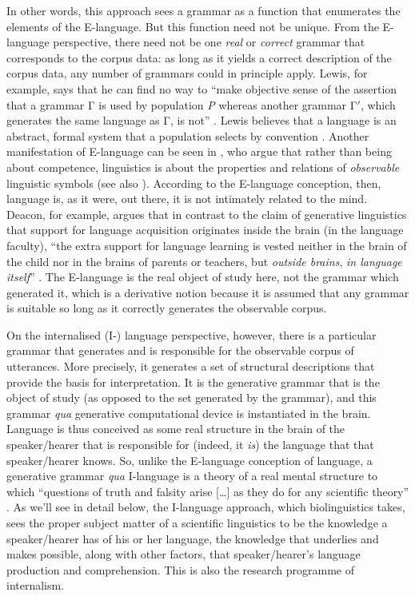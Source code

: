 In other words, this approach sees a grammar as a function that enumerates the elements of the E-language. But this function need not be unique. From the E-language perspective, there need not be one \textit{real} or \textit{correct} grammar that corresponds to the corpus data: as long as it yields a correct description of the corpus data, any number of grammars could in principle apply. Lewis, for example, says that he can find no way to “make objective sense of the assertion that a grammar Γ is used by population \textit{P} whereas another grammar Γ$'$, which generates the same language as Γ, is not” \citep[20]{Lewis1975}. Lewis believes that a language is an abstract, formal system that a population selects by convention \citep{Lewis1969}. Another manifestation of E-language can be seen in \citet{DevittSterelny1989}, who argue that rather than being about competence, linguistics is about the properties and relations of \textit{observable} linguistic symbols (see also \citealt{Devitt2006}). According to the E-language conception, then, language is, as it were, out there, it is not intimately related to the mind. Deacon, for example, argues that in contrast to the claim of generative linguistics that support for language acquisition originates inside the brain (in the language faculty), “the extra support for language learning is vested neither in the brain of the child nor in the brains of parents or teachers, but \textit{outside brains}, \textit{in language itself}” \citep[105, emphasis mine]{Deacon1997}. The E-language is the real object of study here, not the grammar which generated it, which is a derivative notion because it is assumed that any grammar is suitable so long as it correctly generates the observable corpus.

On the internalised (I-) language perspective, however, there is a particular grammar that generates and is responsible for the observable corpus of utterances. More precisely, it generates a set of structural descriptions that provide the basis for interpretation. It is the generative grammar that is the object of study (as opposed to the set generated by the grammar), and this grammar \textit{qua} generative computational device is instantiated in the brain. Language is thus conceived as some real structure in the brain of the speaker/hearer that is responsible for (indeed, it \textit{is}) the language that that speaker/hearer knows. So, unlike the E-language conception of language, a generative grammar \textit{qua} I-language is a theory of a real mental structure to which “questions of truth and falsity arise […] as they do for any scientific theory” \citep[22]{Chomsky1986}. As we'll see in detail below, the I-language approach, which biolinguistics takes, sees the proper subject matter of a scientific linguistics to be the knowledge a speaker/hearer has of his or her language, the knowledge that underlies and makes possible, along with other factors, that speaker/hearer’s language production and comprehension. This is also the research programme of internalism.


